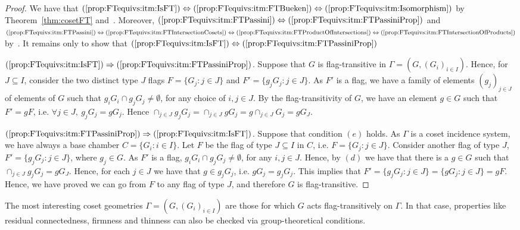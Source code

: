 \documentclass[11pt,letterpaper]{amsart}
\begin{document}
\begin{proof}
    We have that $(\ref{prop:FTequivs:itm:IsFT})\Leftrightarrow (\ref{prop:FTequivs:itm:FTBueken})\Leftrightarrow (\ref{prop:FTequivs:itm:Isomorphism})$ by Theorem~\ref{thm:cosetFT} and~\cite[Theorem 1.8.10]{buekenhout2013diagram}.
    Moreover, $(\ref{prop:FTequivs:itm:FTPassini})\Leftrightarrow (\ref{prop:FTequivs:itm:FTPassiniProp})$ and $(\ref{prop:FTequivs:itm:FTPassini})\Leftrightarrow (\ref{prop:FTequivs:itm:FTIntersectionCosets}) \Leftrightarrow (\ref{prop:FTequivs:itm:FTProductOfIntersections}) \Leftrightarrow (\ref{prop:FTequivs:itm:FTIntersectionOfProducts})$ by~\cite[pp. 306]{Pasini1994}.
    It remains only to show that $(\ref{prop:FTequivs:itm:IsFT})\Leftrightarrow (\ref{prop:FTequivs:itm:FTPassiniProp})$

    $(\ref{prop:FTequivs:itm:IsFT})
    \Rightarrow (\ref{prop:FTequivs:itm:FTPassiniProp})$.
    Suppose that $G$ is flag-transitive in $\Gamma=(G,(G_i)_{i\in I})$. Hence, for $J\subseteq I$, consider the two distinct type $J$ flags $F=\{G_j:j\in J\}$ and $F'= \{g_j G_j:j\in J\}$. As $F'$ is a flag, we have a family of elements $(g_j)_{j\in J}$ of elements of $G$ such that $g_iG_i\cap g_jG_j\neq \emptyset$, for any choice of $i,j\in J$. By the flag-transitivity of $G$, we have an element $g\in G$ such that $F' = gF$, i.e. $\forall j\in J,\ g_j G_j = g G_j$. Hence $\cap_{j\in J} g_j G_j = \cap_{j\in J} g G_j = g \cap_{j\in J} G_j = g G_J$.

    $(\ref{prop:FTequivs:itm:FTPassiniProp})
    \Rightarrow (\ref{prop:FTequivs:itm:IsFT})$. 
    Suppose that condition $(e)$ holds. As $\Gamma$ is a coset incidence system, we have always a base chamber $C=\{G_i:i\in I\}$. Let $F$ be the flag of type $J\subseteq I$ in $C$, i.e. $F= \{G_j:j\in J\}$.
    Consider another flag of type $J$, $F'=\{g_jG_j:j\in J\}$, where $g_j\in G$. As $F'$ is a flag, $g_iG_i\cap g_jG_j\neq \emptyset$, for any $i,j\in J$. Hence, by $(d)$ we have that there is a $g\in G$ such that $\cap_{j\in J} g_j G_j = g G_J$. Hence, for each $j\in J$ we have that $g \in g_jG_j$, i.e. $g G_j = g_j G_j$. This implies that $F' = \{g_j G_j:j\in J\} = \{g G_j:j\in J\} = gF$.
    Hence, we have proved we can go from $F$ to any flag of type $J$, and therefore $G$ is flag-transitive.
\end{proof}



The most interesting coset geometries $\Gamma = (G,(G_i)_{i\in I})$ are those for which $G$ acts flag-transitively on $\Gamma$. In that case, properties like residual connectedness, firmness and thinness can also be checked via group-theoretical conditions.
\end{document}
